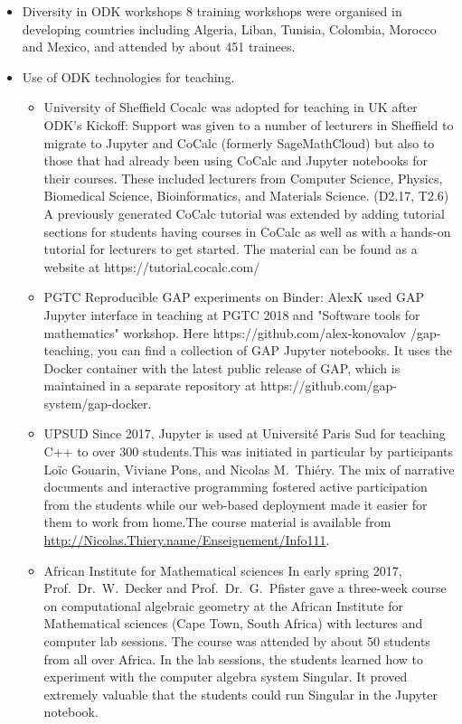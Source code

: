 \begin{enumerate}
\begin{itemize}
\item Diversity in ODK workshops
8 training workshops were organised in developing countries including Algeria, Liban, Tunisia, Colombia, Morocco and Mexico, and attended by about 451 trainees.

\item Use of ODK technologies for teaching.
\begin{itemize}
\item University of Sheffield
Cocalc was adopted for teaching in UK after ODK's Kickoff: Support was given to a number of lecturers in Sheffield to migrate to Jupyter and 
CoCalc (formerly SageMathCloud) but also to those that had already been using CoCalc and Jupyter notebooks for their courses. These included 
lecturers from Computer Science, Physics, Biomedical Science, Bioinformatics, and Materials Science. (D2.17, T2.6) A previously generated 
CoCalc tutorial was extended by adding tutorial sections for students having courses in CoCalc as well as with a hands-on tutorial for 
lecturers to get started. The material can be found as a website at https://tutorial.cocalc.com/ 

\item PGTC 
Reproducible GAP experiments on Binder: AlexK %
used GAP Jupyter interface in teaching at PGTC 2018 and "Software tools for mathematics" workshop. Here https://github.com/alex-konovalov
/gap-teaching, you can find a collection of GAP Jupyter notebooks. It uses the Docker container with the latest public release of GAP, which 
is maintained in a separate repository at https://github.com/gap-system/gap-docker.

\item UPSUD
Since 2017, Jupyter is used at Université Paris Sud for teaching C++ to over 300 students.This was initiated in particular by
     \ODK participants Loïc Gouarin, Viviane Pons, and Nicolas M.\ Thiéry. The mix of narrative documents and interactive programming 
     fostered active participation from the students while our web-based deployment made it easier for them to work from home.The course 
     material is available from \url{http://Nicolas.Thiery.name/Enseignement/Info111}.
     
 \item African Institute for Mathematical sciences
 In early spring 2017, Prof.~Dr.~W.~Decker and Prof.~Dr.~G.~Pfister gave a three-week course on computational algebraic geometry 
     at the African Institute for Mathematical sciences (Cape Town, South Africa) with lectures and computer lab sessions.
     The course was attended by about 50 students from all over Africa. In the lab sessions, the students learned how to experiment with the
     computer algebra system Singular. It proved extremely valuable that the students could run Singular in the Jupyter notebook.
     

\end{itemize}
\end{itemize}
\end{enumerate}
